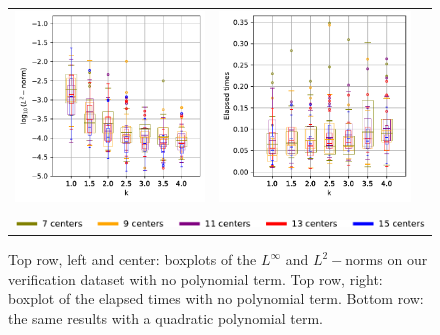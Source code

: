 \documentclass[12pt]{report} %
\begin{document}
\begin{figure}[h]
\begin{tabular}{ccc}
  \includegraphics[width=.42\textwidth]{imagenes/experiments/1d/statistical_1d_full_scheduler_interpolation/boxplot_l2_u2_Poly2.pdf} &
  \includegraphics[width=.42\textwidth]{imagenes/experiments/1d/statistical_1d_full_scheduler_interpolation/boxplot_times_u2_Poly2.pdf} \\
  \multicolumn{3}{c}{{\includegraphics[width=\textwidth]
          {imagenes/experiments/1d/statistical_1d_full_scheduler_interpolation/legend.pdf}}}
  \end{tabular}
  \caption{Top row, left and center: boxplots of the $L^\infty$ and $L^2-$norms on our verification dataset with no polynomial term. Top row, right: boxplot of the elapsed times with no polynomial term. Bottom row: the same results with a quadratic polynomial term.}
  \label{fig:u2-results-poly-1}
\end{figure}
\end{document}
